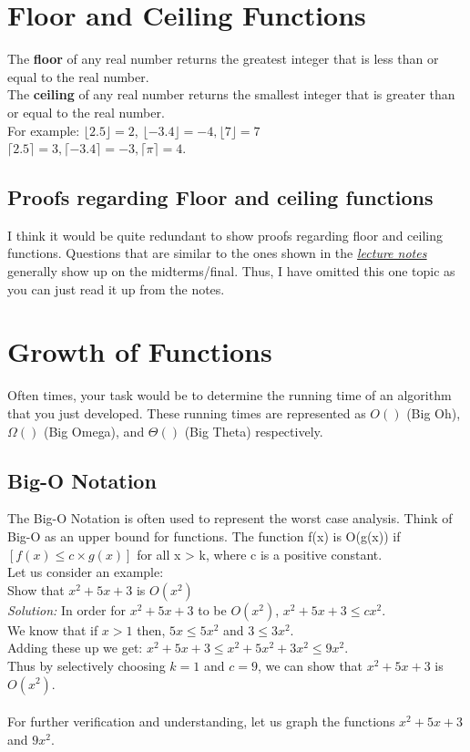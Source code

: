 \section{Floor and Ceiling Functions}
The \textbf{floor} of any real number returns the greatest integer that is less
than or equal to the real number. \\
The \textbf{ceiling} of any real number returns the smallest integer that is
greater than or equal to the real number. \\

For example: $\lfloor 2.5 \rfloor = 2$, $\lfloor -3.4 \rfloor = -4, \lfloor 7
\rfloor = 7$ \\
\indent \indent $\lceil 2.5 \rceil = 3, \lceil -3.4 \rceil = -3, \lceil \pi
\rceil = 4$.

\subsection{Proofs regarding Floor and ceiling functions}
I think it would be quite redundant to show proofs regarding floor and ceiling
functions. Questions that are similar to the ones shown in the
\href{http://nook.cs.ucdavis.edu/~koehl/Teaching/ECS20/Lectures/Lecture5_notes.pdf}{\underline{\emph{lecture
notes}}} generally show up on the midterms/final. Thus, I have omitted this one
topic as you can just read it up from the notes.

\section{Growth of Functions}
Often times, your task would be to determine the running time of an algorithm
that you just developed. These running times are represented as $O()$ (Big Oh),
$\Omega()$ (Big Omega), and $\Theta()$ (Big Theta) respectively.

\subsection{Big-O Notation}
The Big-O Notation is often used to represent the worst case analysis. Think of
Big-O as an upper bound for functions. The function f(x) is O(g(x)) if $[f(x)
\leq c \times g(x)]$ for all x > k, where c is a positive constant.\\
Let us consider an example: \\
Show that $x^{2} + 5x + 3$ is $O(x^{2})$ \\
\indent \emph{Solution:} In order for $x^{2} + 5x + 3$ to be $O(x^{2})$, $x^{2}
+ 5x + 3 \leq cx^{2}$. \\
\indent \indent We know that if $x > 1$ then, $5x \leq 5x^{2}$ and $3 \leq
3x^{2}$. \\
\indent \indent Adding these up we get: $x^{2} + 5x + 3 \leq x^{2} + 5x^{2} +
3x^{2} \leq 9x^{2}$. \\
\indent \indent Thus by selectively choosing $k = 1$ and $c = 9$, we can show
that $x^{2} + 5x + 3$ is $O(x^{2})$. \\ \\
\noindent For further verification and understanding, let us graph the
functions $x^{2} + 5x + 3$ and $9x^{2}$.

